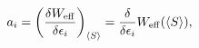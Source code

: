 \begin{equation}
a_{i}=\left( \frac{\delta W_{{\rm {eff}}}}{\delta \epsilon _{i}}\right)
_{\langle S\rangle }=\frac{\delta }{\delta \epsilon _{i}}W_{{\rm {eff}}%
}(\langle S\rangle ),  \label{ai}
\end{equation}

